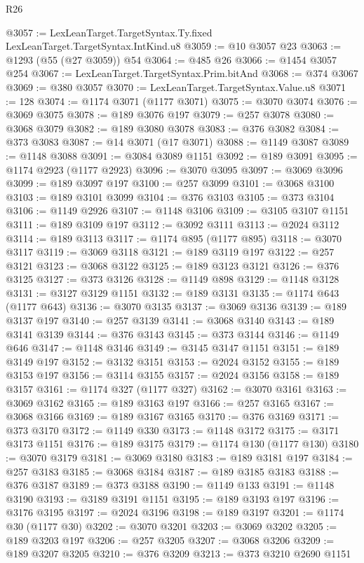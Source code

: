 \begin{lexlean}{R26}
\begin{coremodule}
@3057 := LexLeanTarget.TargetSyntax.Ty.fixed LexLeanTarget.TargetSyntax.IntKind.u8
@3059 := @10 @3057 @23
@3063 := @1293 (@55 (@27 @3059)) @54
@3064 := @485 @26
@3066 := @1454 @3057 @254
@3067 := LexLeanTarget.TargetSyntax.Prim.bitAnd
@3068 := @374 @3067
@3069 := @380 @3057
@3070 := LexLeanTarget.TargetSyntax.Value.u8
@3071 := 128
@3074 := @1174 @3071 (@1177 @3071)
@3075 := @3070 @3074
@3076 := @3069 @3075
@3078 := @189 @3076 @197
@3079 := @257 @3078
@3080 := @3068 @3079
@3082 := @189 @3080 @3078
@3083 := @376 @3082
@3084 := @373 @3083
@3087 := @14 @3071 (@17 @3071)
@3088 := @1149 @3087
@3089 := @1148 @3088
@3091 := @3084 @3089 @1151
@3092 := @189 @3091
@3095 := @1174 @2923 (@1177 @2923)
@3096 := @3070 @3095
@3097 := @3069 @3096
@3099 := @189 @3097 @197
@3100 := @257 @3099
@3101 := @3068 @3100
@3103 := @189 @3101 @3099
@3104 := @376 @3103
@3105 := @373 @3104
@3106 := @1149 @2926
@3107 := @1148 @3106
@3109 := @3105 @3107 @1151
@3111 := @189 @3109 @197
@3112 := @3092 @3111
@3113 := @2024 @3112
@3114 := @189 @3113
@3117 := @1174 @895 (@1177 @895)
@3118 := @3070 @3117
@3119 := @3069 @3118
@3121 := @189 @3119 @197
@3122 := @257 @3121
@3123 := @3068 @3122
@3125 := @189 @3123 @3121
@3126 := @376 @3125
@3127 := @373 @3126
@3128 := @1149 @898
@3129 := @1148 @3128
@3131 := @3127 @3129 @1151
@3132 := @189 @3131
@3135 := @1174 @643 (@1177 @643)
@3136 := @3070 @3135
@3137 := @3069 @3136
@3139 := @189 @3137 @197
@3140 := @257 @3139
@3141 := @3068 @3140
@3143 := @189 @3141 @3139
@3144 := @376 @3143
@3145 := @373 @3144
@3146 := @1149 @646
@3147 := @1148 @3146
@3149 := @3145 @3147 @1151
@3151 := @189 @3149 @197
@3152 := @3132 @3151
@3153 := @2024 @3152
@3155 := @189 @3153 @197
@3156 := @3114 @3155
@3157 := @2024 @3156
@3158 := @189 @3157
@3161 := @1174 @327 (@1177 @327)
@3162 := @3070 @3161
@3163 := @3069 @3162
@3165 := @189 @3163 @197
@3166 := @257 @3165
@3167 := @3068 @3166
@3169 := @189 @3167 @3165
@3170 := @376 @3169
@3171 := @373 @3170
@3172 := @1149 @330
@3173 := @1148 @3172
@3175 := @3171 @3173 @1151
@3176 := @189 @3175
@3179 := @1174 @130 (@1177 @130)
@3180 := @3070 @3179
@3181 := @3069 @3180
@3183 := @189 @3181 @197
@3184 := @257 @3183
@3185 := @3068 @3184
@3187 := @189 @3185 @3183
@3188 := @376 @3187
@3189 := @373 @3188
@3190 := @1149 @133
@3191 := @1148 @3190
@3193 := @3189 @3191 @1151
@3195 := @189 @3193 @197
@3196 := @3176 @3195
@3197 := @2024 @3196
@3198 := @189 @3197
@3201 := @1174 @30 (@1177 @30)
@3202 := @3070 @3201
@3203 := @3069 @3202
@3205 := @189 @3203 @197
@3206 := @257 @3205
@3207 := @3068 @3206
@3209 := @189 @3207 @3205
@3210 := @376 @3209
@3213 := @373 @3210 @2690 @1151

\end{coremodule}
\end{lexlean}
